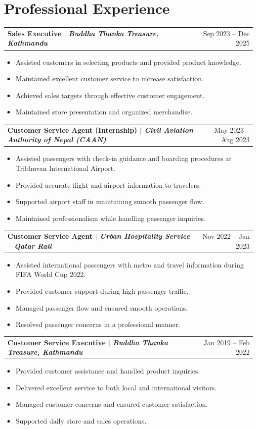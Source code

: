\documentclass[a4paper,11pt]{article}
\makeatletter
\newenvironment{joblong}[2]
    {
    \begin{tabularx}{\linewidth}{@{}X r@{}}
    \textbf{#1} & #2 \\[3.75pt]
    \end{tabularx}
    \begin{minipage}[t]{\linewidth}
    \begin{itemize}[nosep,after=\strut, leftmargin=1em, itemsep=1pt,label=--]
    }
    {
    \end{itemize}
    \end{minipage}    
    }
\makeatother
\begin{document}
\section{Professional Experience}

\begin{joblong}{Sales Executive $|$ \normalfont\textit{Buddha Thanka Treasure, Kathmandu}}{Sep 2023 -- Dec 2025}
\item Assisted customers in selecting products and provided product knowledge.
\item Maintained excellent customer service to increase satisfaction.
\item Achieved sales targets through effective customer engagement.
\item Maintained store presentation and organized merchandise.
\end{joblong}

\begin{joblong}{Customer Service Agent (Internship) $|$ \normalfont\textit{Civil Aviation Authority of Nepal (CAAN)}}{May 2023 -- Aug 2023}
\item Assisted passengers with check-in guidance and boarding procedures at Tribhuvan International Airport.
\item Provided accurate flight and airport information to travelers.
\item Supported airport staff in maintaining smooth passenger flow.
\item Maintained professionalism while handling passenger inquiries.
\end{joblong}

\begin{joblong}{Customer Service Agent $|$ \normalfont\textit{Urban Hospitality Service – Qatar Rail}}{Nov 2022 -- Jan 2023}
\item Assisted international passengers with metro and travel information during FIFA World Cup 2022.
\item Provided customer support during high passenger traffic.
\item Managed passenger flow and ensured smooth operations.
\item Resolved passenger concerns in a professional manner.
\end{joblong}

\begin{joblong}{Customer Service Executive $|$ \normalfont\textit{Buddha Thanka Treasure, Kathmandu}}{Jan 2019 -- Feb 2022}
\item Provided customer assistance and handled product inquiries.
\item Delivered excellent service to both local and international visitors.
\item Managed customer concerns and ensured customer satisfaction.
\item Supported daily store and sales operations.
\end{joblong}
\end{document}
